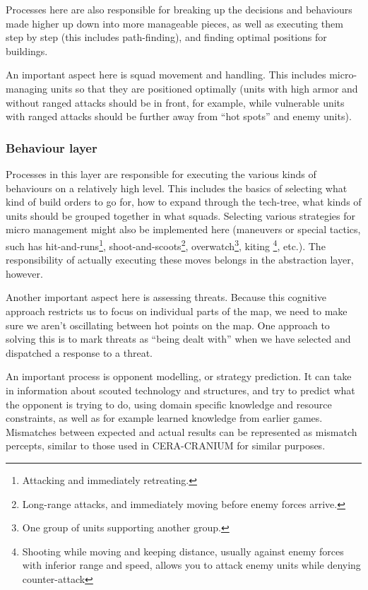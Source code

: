 Processes here are also responsible for breaking up the decisions and behaviours
made higher up down into more manageable pieces, as well as executing them step
by step (this includes path-finding), and finding optimal positions for
buildings.

An important aspect here is squad movement and handling. This includes
micro-managing units so that they are positioned optimally (units with high
armor and without ranged attacks should be in front, for example, while
vulnerable units with ranged attacks should be further away from ``hot spots''
and enemy units).

\subsubsection{Behaviour layer}
Processes in this layer are responsible for executing the various kinds of
behaviours on a relatively high level. This includes the basics of selecting
what kind of build orders to go for, how to expand through the tech-tree, what
kinds of units should be grouped together in what squads. Selecting various
strategies for micro management might also be implemented here (maneuvers or
special tactics, such has hit-and-runs\footnote{Attacking and immediately
retreating.}, shoot-and-scoots\footnote{Long-range attacks, and immediately
moving before enemy forces arrive.}, overwatch\footnote{One group of units
supporting another group.}, kiting \footnote{Shooting while moving and keeping
distance, usually against enemy forces with inferior range and speed, allows you
to attack enemy units while denying counter-attack}, etc.). The responsibility
of actually executing these moves belongs in the abstraction layer, however.

Another important aspect here is assessing threats. Because this cognitive
approach restricts us to focus on individual parts of the map, we need to make
sure we aren't oscillating between hot points on the map. One approach to
solving this is to mark threats as ``being dealt with'' when we have selected
and dispatched a response to a threat.

An important process is opponent modelling, or strategy prediction. It can take
in information about scouted technology and structures, and try to predict what
the opponent is trying to do, using domain specific knowledge and resource
constraints, as well as for example learned knowledge from earlier games.
Mismatches between expected and actual results can be represented as mismatch
percepts, similar to those used in CERA-CRANIUM for similar purposes.

